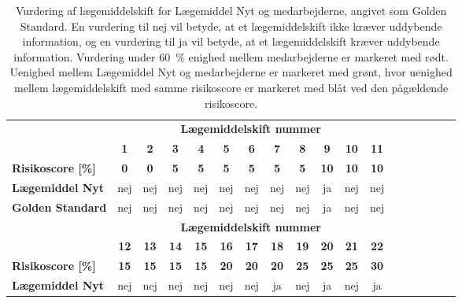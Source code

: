 \vspace{0.5cm}
\begin{longtable}{l|c|c|c|c|c|c|c|c|c|c|c|c|c|c|c|c|c}
\caption{Vurdering af lægemiddelskift for Lægemiddel Nyt og medarbejderne, angivet som Golden Standard. En vurdering til nej vil betyde, at et lægemiddelskift ikke kræver uddybende information, og en vurdering til ja vil betyde, at et lægemiddelskift kræver uddybende information. Vurdering under 60~\% enighed mellem medarbejderne er markeret med rødt. Uenighed mellem Lægemiddel Nyt og medarbejderne er markeret med grønt, hvor uenighed mellem lægemiddelskift med samme risikoscore er markeret med blåt ved den pågældende risikoscore.}
	\label{table:test2} \\
\rowcolor[HTML]{C0C0C0} \textbf{} & \multicolumn{11}{|c}{\textbf{Lægemiddelskift nummer}} \\
\rowcolor[HTML]{C0C0C0} & \textbf{1} & \textbf{2} & \textbf{3} & \textbf{4} & \textbf{5} & \textbf{6} & \textbf{7} &  \textbf{8} & \textbf{9} & \textbf{10} & \textbf{11}   \\ \hline
\cellcolor[HTML]{C0C0C0}\textbf{Risikoscore [\%]} & \textbf{0}  & \textbf{0} &\textbf{5} & \textbf{5} & \textbf{5} & \textbf{5} & \textbf{5} & \textbf{5} & \cellcolor[HTML]{34CDF9}\textbf{10} &  \textbf{10} & \textbf{10} \\ \hline
\cellcolor[HTML]{C0C0C0}\textbf{Lægemiddel Nyt} & nej & nej & nej & nej & nej & nej & nej & nej & ja & nej & nej \\ \hline
\cellcolor[HTML]{C0C0C0}\textbf{Golden Standard} & nej & nej & nej& nej & nej &nej & nej & nej& ja & nej & nej \\ \hline
\newpage
\rowcolor[HTML]{C0C0C0} & \multicolumn{11}{|c}{\textbf{Lægemiddelskift nummer}} \\
\rowcolor[HTML]{C0C0C0} & \textbf{12} & \textbf{13} & \textbf{14} &  \textbf{15} & \textbf{16} & \textbf{17} & \textbf{18} & \textbf{19} & \textbf{20} & \textbf{21} & \textbf{22}  \\ \hline
\cellcolor[HTML]{C0C0C0}\textbf{Risikoscore [\%]} & \cellcolor[HTML]{F6E6E5} \textbf{15} & \textbf{15} & \cellcolor[HTML]{34CDF9}\textbf{15} & \textbf{15} & \textbf{20} & \textbf{20} & \cellcolor[HTML]{34CDF9}\textbf{20} & \textbf{25} & \cellcolor[HTML]{34CDF9}\textbf{25} & \textbf{25} & \cellcolor[HTML]{34CDF9}\textbf{30} \\ \hline
\cellcolor[HTML]{C0C0C0}\textbf{Lægemiddel Nyt} & \cellcolor[HTML]{F6E6E5}nej & nej & \cellcolor[HTML]{32CB00}nej & nej & nej & nej & \cellcolor[HTML]{32CB00}ja & \cellcolor[HTML]{32CB00}nej & \cellcolor[HTML]{32CB00}ja & \cellcolor[HTML]{32CB00} nej & ja\\ \hline

\end{longtable}
